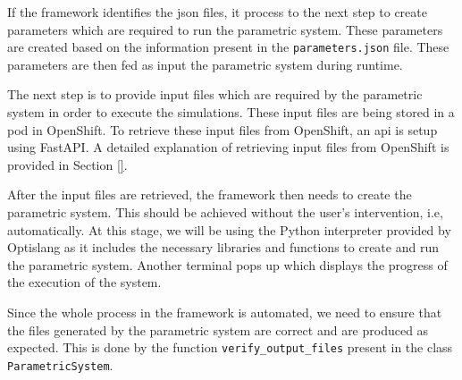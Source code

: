 If the framework identifies the \acrshort{json} files, it process to the next step to create
parameters which are required to run the parametric system. These parameters are created based on the information present in the \texttt{parameters.json} file. These
parameters are then fed as input the parametric system during runtime.

The next step is to provide input files which are required by the parametric system in order to execute the simulations. These input files are being stored
in a pod in OpenShift. To retrieve these input files from OpenShift, an \acrshort{api} is setup using FastAPI. A detailed explanation of retrieving input files
from OpenShift is provided in Section \ref{}.

After the input files are retrieved, the framework then needs to create the parametric system. This should be achieved without the user's intervention, i.e, 
automatically. At this stage, we will be using the Python interpreter provided by Optislang as it includes the necessary libraries and functions to create and run 
the parametric system. Another terminal pops up which displays the progress of the execution of the system.

Since the whole process in the framework is automated, we need to ensure that the files generated by the parametric system are correct and are produced as 
expected. This is done by the function \texttt{verify\_output\_files} present in the class \texttt{ParametricSystem}. 


